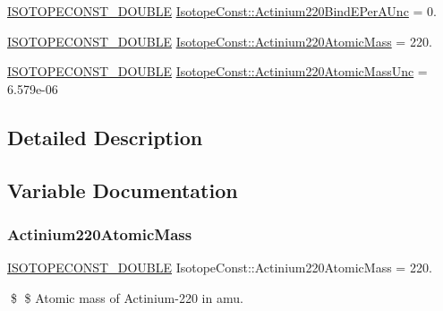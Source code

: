 \begin{DoxyCompactItemize}
\mbox{\hyperlink{group___isotope_const-_macros_ga8f45a7272ce02c0b4c65c44636ed719a}{I\+S\+O\+T\+O\+P\+E\+C\+O\+N\+S\+T\+\_\+\+D\+O\+U\+B\+LE}} \mbox{\hyperlink{group___isotope_const-_actinium-_ac220_ga0be2545fe21fb472f5fe79a11b3ccc3b}{Isotope\+Const\+::\+Actinium220\+Bind\+E\+Per\+A\+Unc}} = 0.
\item 
\mbox{\hyperlink{group___isotope_const-_macros_ga8f45a7272ce02c0b4c65c44636ed719a}{I\+S\+O\+T\+O\+P\+E\+C\+O\+N\+S\+T\+\_\+\+D\+O\+U\+B\+LE}} \mbox{\hyperlink{group___isotope_const-_actinium-_ac220_ga5e5d9a8eb7aefae5afd881dc341b062a}{Isotope\+Const\+::\+Actinium220\+Atomic\+Mass}} = 220.
\item 
\mbox{\hyperlink{group___isotope_const-_macros_ga8f45a7272ce02c0b4c65c44636ed719a}{I\+S\+O\+T\+O\+P\+E\+C\+O\+N\+S\+T\+\_\+\+D\+O\+U\+B\+LE}} \mbox{\hyperlink{group___isotope_const-_actinium-_ac220_ga8c721440b56ee56457d4bd96556241e6}{Isotope\+Const\+::\+Actinium220\+Atomic\+Mass\+Unc}} = 6.\+579e-\/06
\end{DoxyCompactItemize}


\subsection{Detailed Description}


\subsection{Variable Documentation}
\mbox{\label{group___isotope_const-_actinium-_ac220_ga5e5d9a8eb7aefae5afd881dc341b062a}} 
\subsubsection{\texorpdfstring{Actinium220\+Atomic\+Mass}{Actinium220AtomicMass}}
{\footnotesize\ttfamily \mbox{\hyperlink{group___isotope_const-_macros_ga8f45a7272ce02c0b4c65c44636ed719a}{I\+S\+O\+T\+O\+P\+E\+C\+O\+N\+S\+T\+\_\+\+D\+O\+U\+B\+LE}} Isotope\+Const\+::\+Actinium220\+Atomic\+Mass = 220.}

\$ \$ Atomic mass of Actinium-\/220 in amu. \mbox{\label{group___isotope_const-_actinium-_ac220_ga8c721440b56ee56457d4bd96556241e6}} 

